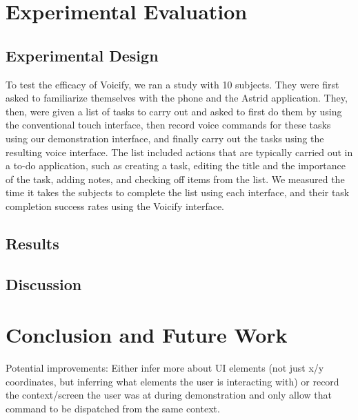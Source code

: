 \documentclass[letterpaper]{article}
\begin{document}
\section{Experimental Evaluation}
\subsection{Experimental Design}
To test the efficacy of Voicify, we ran a study with 10 subjects. They were first asked to 
familiarize themselves with the phone and the Astrid application. They, then, were given a list of tasks to carry out and 
asked to first do them by using the conventional touch interface, then record voice commands for these tasks using our 
demonstration interface, and finally carry out the tasks using the resulting voice interface. The list included actions that are typically 
carried out in a to-do application, such as creating a task, editing the title and the importance of the task, adding notes, and checking 
off items from the list. We measured the time it takes the subjects to complete the list 
using each interface, and their task completion success rates using the Voicify interface. 



\subsection{Results}

\subsection{Discussion}

\section{Conclusion and Future Work}
Potential improvements: Either infer more about UI elements (not just 
x/y coordinates, but inferring what elements the user is interacting with)
or record the context/screen the user was at during demonstration and only allow 
that command to be dispatched from the same context.
\end{document}
